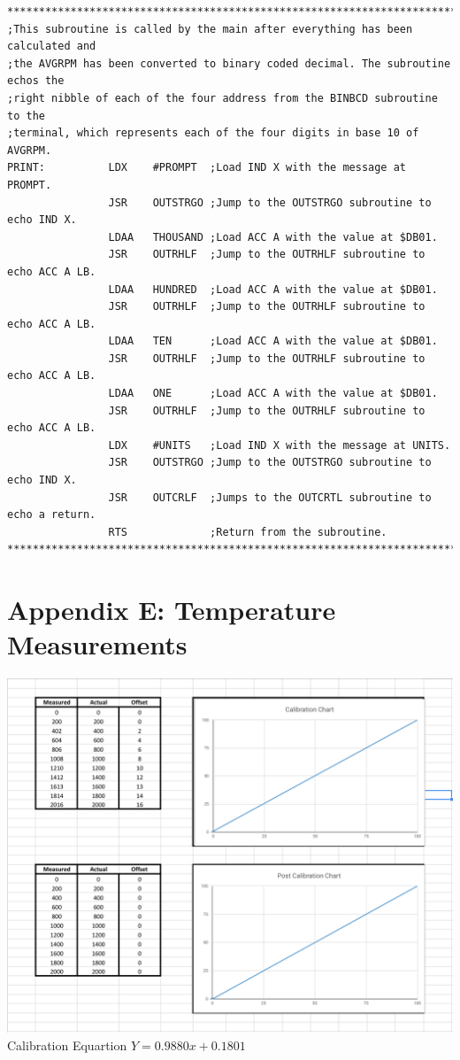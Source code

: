 \documentclass[12pt]{report}
\begin{document}
\begin{Verbatim}[frame=single, fontsize=\footnotesize]
****************************************************************************************
;This subroutine is called by the main after everything has been calculated and
;the AVGRPM has been converted to binary coded decimal. The subroutine echos the
;right nibble of each of the four address from the BINBCD subroutine to the
;terminal, which represents each of the four digits in base 10 of AVGRPM.
PRINT:          LDX    #PROMPT  ;Load IND X with the message at PROMPT.
                JSR    OUTSTRGO ;Jump to the OUTSTRGO subroutine to echo IND X.
                LDAA   THOUSAND ;Load ACC A with the value at $DB01.
                JSR    OUTRHLF  ;Jump to the OUTRHLF subroutine to echo ACC A LB.
                LDAA   HUNDRED  ;Load ACC A with the value at $DB01.
                JSR    OUTRHLF  ;Jump to the OUTRHLF subroutine to echo ACC A LB.
                LDAA   TEN      ;Load ACC A with the value at $DB01.
                JSR    OUTRHLF  ;Jump to the OUTRHLF subroutine to echo ACC A LB.
                LDAA   ONE      ;Load ACC A with the value at $DB01.
                JSR    OUTRHLF  ;Jump to the OUTRHLF subroutine to echo ACC A LB.
                LDX    #UNITS   ;Load IND X with the message at UNITS.
                JSR    OUTSTRGO ;Jump to the OUTSTRGO subroutine to echo IND X.
                JSR    OUTCRLF  ;Jumps to the OUTCRTL subroutine to echo a return.
                RTS             ;Return from the subroutine.
****************************************************************************************
   \end{Verbatim}
	
\section*{Appendix E: Temperature Measurements}
	\begin{center}
		\includegraphics[scale=.48]{chart.PNG}
		Calibration Equartion $Y = 0.9880x + 0.1801$
	\end{center}
\end{document}
